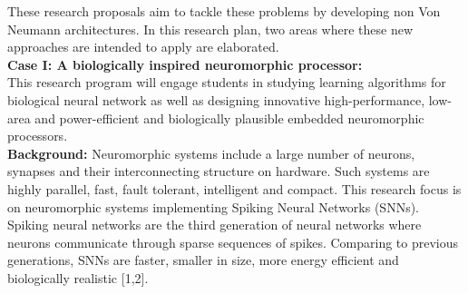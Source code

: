 \documentclass[12pt,oneside]{book}
\begin{document}
These research proposals aim to tackle these problems by developing non Von Neumann architectures. In this research plan, two areas where these new approaches are intended to apply are elaborated. \\
{\bf Case I: A biologically inspired neuromorphic processor: } \\
This research program will engage  students in studying learning algorithms for biological neural network as well as designing innovative high-performance, low-area and power-efficient  and  biologically plausible embedded neuromorphic processors.\\ [0.2cm]
{\bf Background: } 
%
Neuromorphic systems  include a large number of neurons, synapses and their interconnecting structure on hardware.  Such systems are highly parallel, fast, fault tolerant,  intelligent and
compact.  This research focus is on neuromorphic systems implementing Spiking Neural Networks (SNNs). 
Spiking neural networks  are the third generation of neural networks where neurons communicate through sparse sequences of spikes. Comparing to previous generations, SNNs
are faster, smaller in size, more energy efficient and biologically realistic [1,2]. 
\end{document}
